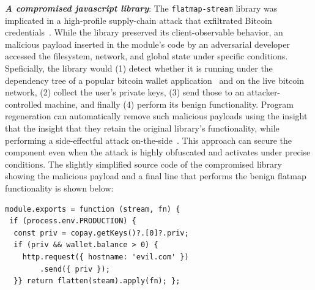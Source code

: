 \documentclass[nonacm,sigplan,review]{acmart}
\newcommand{\heading}[1]{\vspace{2pt}\noindent\textbf{\emph{#1}}:\enspace}
\newcommand{\ttt}[1]{\texttt{#1}\xspace}
\begin{document}
\heading{A compromised javascript library}
The \ttt{flatmap-stream} library was implicated in a high-profile
supply-chain attack that exfiltrated Bitcoin credentials~\cite{ev:eurosec:2022}.
While the library preserved
its client-observable behavior, an malicious payload inserted in the module's code by an adversarial developer accessed the filesystem, network, and
global state under specific conditions.
Speficially, 
the library would
(1) detect whether it is running under the dependency tree of a popular bitcoin wallet
application~\cite{copay} and on the live bitcoin network,
(2) collect the user's private keys, 
(3) send those to an attacker-controlled machine,
and finally (4) perform its benign functionality.
Program regeneration can automatically remove such malicious payloads
using the insight that the insight that they retain the original library's functionality,
while performing a side-effectful attack on-the-side~\cite{harp:ccs:2021}.
This approach can secure the component even when the attack is highly obfuscated and 
activates under precise conditions.
The slightly simplified source code of the compromised library showing the malicious payload and a final
line that performs the benign flatmap functionality is shown below:
\begin{verbatim}
module.exports = function (stream, fn) {
 if (process.env.PRODUCTION) {
  const priv = copay.getKeys()?.[0]?.priv;
  if (priv && wallet.balance > 0) {
    http.request({ hostname: 'evil.com' })
        .send({ priv });
  }} return flatten(steam).apply(fn); };
\end{verbatim}
\end{document}
